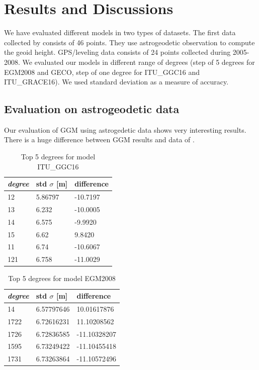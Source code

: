 \chapter{Results and Discussions}
We have evaluated different models in two types of datasets. The first data collected by \citep{adam} consists of 46 points. They use astrogeodetic observation to compute the geoid height. GPS/leveling data consists of 24 points collected during 2005-2008. We evaluated our models in different range of degrees (step of 5 degrees for EGM2008 and GECO, step of one degree for ITU\_GGC16 and ITU\_GRACE16). We used standard deviation as a measure of accuracy.

\section{Evaluation on astrogeodetic data}

Our evaluation of GGM using astrogedetic data shows very interesting results. There is a huge difference between GGM results and data of \citep{adam}. 


  \begin{table}[]
  	\centering
  	\caption{Top 5 degrees for model ITU\_GGC16}
  	\label{table:ggm_models}
  	\begin{tabular}{@{}lll@{}}
  		\toprule
  		\emph{degree} & std $\sigma$ [m]  & difference\\ \midrule
  		12 & 5.86797 &-10.7197\\
  		13 & 6.232&-10.0005\\
  		14 & 6.575&-9.9920\\
  		15 & 6.62&9.8420\\
  		11 & 6.74&-10.6067\\
  		121 & 6.758&-11.0029\\ \bottomrule  		
  	\end{tabular}
  \end{table}
  
    \begin{table}[]
    	\centering
    	\caption{Top 5 degrees for model EGM2008}
    	\label{table:ggm_models_egm2008}
    	\begin{tabular}{@{}lll@{}}
    		\toprule
    		\emph{degree} & std $\sigma$ [m]  & difference\\ \midrule
    		14 &6.57797646 &10.01617876\\
    		1722& 6.72616231& 11.10208562\\
    		1726 &6.72836585 &-11.10328207\\
    		1595 &6.73249422 &-11.10455418\\
    		1731 &6.73263864 &-11.10572496 \\ \bottomrule
    		
    	\end{tabular}
    \end{table}
    
